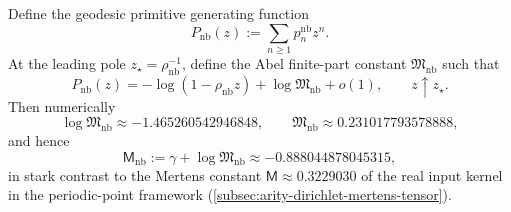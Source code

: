 \begin{theorem}\label{thm:real-input-40-geodesic-mertens}
Define the geodesic primitive generating function
\[
P_{\mathrm{nb}}(z):=\sum_{n\ge 1}p_n^{\mathrm{nb}}z^n.
\]
At the leading pole \(z_\star=\rho_{\mathrm{nb}}^{-1}\), define the Abel finite-part constant \(\mathfrak{M}_{\mathrm{nb}}\) such that
\[
P_{\mathrm{nb}}(z)=-\log(1-\rho_{\mathrm{nb}}z)+\log\mathfrak{M}_{\mathrm{nb}}+o(1),
\qquad z\uparrow z_\star.
\]
Then numerically
\[
\boxed{
\log\mathfrak{M}_{\mathrm{nb}}\approx -1.465260542946848,\qquad
\mathfrak{M}_{\mathrm{nb}}\approx 0.231017793578888,
}
\]
and hence
\[
\boxed{
\mathsf{M}_{\mathrm{nb}}:=\gamma+\log\mathfrak{M}_{\mathrm{nb}}\approx -0.888044878045315,
}
\]
in stark contrast to the Mertens constant \(\mathsf{M}\approx 0.3229030\) of the real input kernel in the periodic-point framework (\ref{subsec:arity-dirichlet-mertens-tensor}).
\end{theorem}

